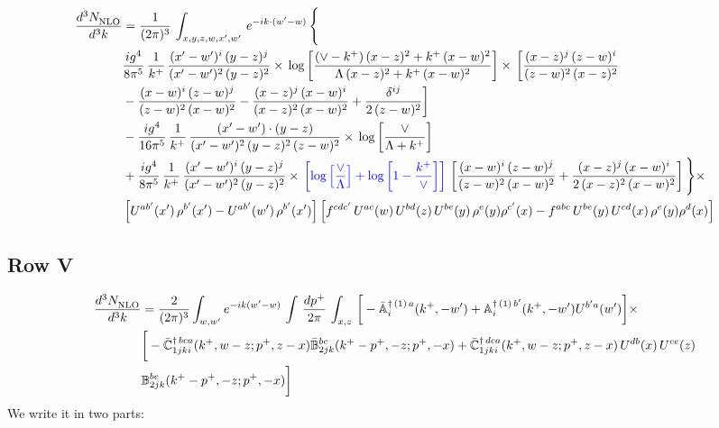 \documentclass[9pt]{article}
\def\mf#1{\mathbb{#1}}
\numberwithin{equation}{section}
\begin{document}
\begin{align}
    \frac{d^{3}N_{\rm NLO}^{\rm}}{d^{3}k}  & =  \frac{1}{(2\pi)^{3}}\,
    \int_{x,y,z,w,x',w'}\,e^{-ik\cdot (w^\prime-w)}\,\Bigg\{\notag \\ & \frac{ig^{4}}{8\pi^{5}}\,\frac{1}{k^{+}}\,\frac{(x'-w')^{i}\,(y-z)^{j}}{(x'-w')^{2}\,(y-z)^{2}}\times\,\log{\left[\frac{(\vee-k^{+})\,(x-z)^{2}+k^{+}\,(x-w)^{2}}{\Lambda\, (x-z)^{2} + k^{+}\,(x-w)^{2}}\right]}\times\, \bigg[\frac{(x-z)^{j}\,(z-w)^{i}}{(z-w)^{2}\,(x-z)^{2}}\notag \\ & -\frac{(x-w)^{i}\,(z-w)^{j}}{(z-w)^{2}\,(x-w)^{2}}-\frac{(x-z)^{j}\,(x-w)^{i}}{(x-z)^{2}\,(x-w)^{2}}+\frac{\delta^{ij}}{2\,(z-w)^{2}}\bigg]\notag \\ & -\frac{ig^{4}}{16\pi^{5}}\,\frac{1}{k^{+}}\,\frac{(x'-w')\cdot (y-z)}{(x'-w')^{2}\,(y-z)^{2}\,(z-w)^{2}}\times\,\log{\left[\frac{\vee}{\Lambda + k^{+}}\right]}\notag \\ & + \frac{ig^{4}}{8\pi^{5}}\,\frac{1}{k^{+}}\,\frac{(x'-w')^{i}\,(y-z)^{j}}{(x'-w')^{2}\,(y-z)^{2}}\times\,{\color{blue}\left[\log{\left[\frac{\vee}{\Lambda}\right]} + \log{\left[1-\frac{k^{+}}{\vee}\right]}\right]}\,\left[\frac{(x-w)^{i}\,(z-w)^{j}}{(z-w)^{2}\,(x-w)^{2}}+\frac{(x-z)^{j}\,(x-w)^{i}}{2\, (x-z)^{2}\,(x-w)^{2}}\right] \Bigg\}\times\notag \\ &  \left[U^{ab'}(x')\,\rho^{b'}(x')-U^{ab'}(w')\,\rho^{b'}(x')\right] \left[f^{cdc'}\,U^{ac}(w)\,U^{bd}(z)\,U^{be}(y)\,\rho^{e}(y)\rho^{c'}(x)-f^{abc}\,U^{be}(y)\,U^{cd}(x)\,\rho^{e}(y)\rho^{d}(x)\right]
\end{align}
\subsection{Row V}
\begin{align}
    \frac{d^{3}N_{\rm NLO}^{\rm}}{d^{3}k}  & = \frac{2}{(2\pi)^{3}}  \int_{w, w^\prime} e^{-ik(w^\prime-w)}\, \int\, \frac{dp^{+}}{2\pi}\,\int_{x,z}\, \bigg[-\bar{\mf{A}}^{\dagger\,(1)\,a}_{i}(k^{+},-w^{\prime})+\mf{A}^{\dagger\, (1)\, b^{\prime}}_{i}(k^{+},-w^{\prime})U^{b^{\prime}a}(w^{\prime})\bigg]\times\notag \\ & \bigg[-\Bar{\mf{C}}^{\dagger\, bca}_{1jki}(k^{+},w-z;p^{+},z-x)\Bar{\mf{B}}^{bc}_{2jk}(k^{+}-p^{+},- z;p^{+},-x)+\bar{\mf{C}}^{\dagger\, dca}_{1jki}(k^+,w-z; p^+, z-x)\,U^{db}(x)\,U^{ce}(z) \notag \\ & {\mf{B}}^{be}_{2jk} (k^{+}-p^+, -z; p^+, -x) \bigg]\nonumber
\end{align}
We write it in two parts:
\end{document}

